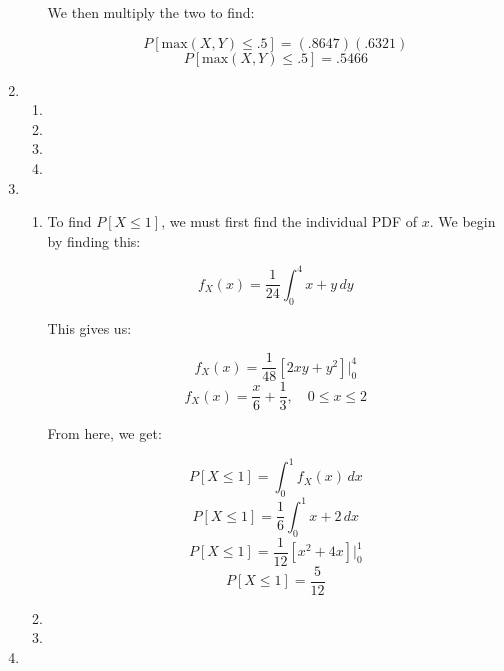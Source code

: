 \begin{enumerate}
\begin{enumerate}
        We then multiply the two to find:

        $$P[\text{max}(X,Y)\leq .5]=(.8647)(.6321)$$
        $$\boxed{P[\text{max}(X,Y)\leq .5]=.5466}$$

    \end{enumerate}

  \item

    \begin{enumerate}

      \item

      \item 

      \item 

      \item 

    \end{enumerate}

    \setcounter{enumi}{3}

  \item

    \begin{enumerate}

      \item To find $P[X\leq 1]$, we must first find the individual PDF of $x$. We begin by finding this:

        $$f_X(x)=\frac{1}{24}\int_0^4 x+y\,dy$$

        This gives us:

        $$f_X(x)=\frac{1}{48}\left[2xy+y^2\right]\Big|_0^4$$
        $$f_X(x)=\frac{x}{6}+\frac{1}{3},\quad 0\leq x\leq 2$$

        From here, we get:

        $$P[X\leq 1]=\int_0^1 f_X(x)\,dx$$
        $$P[X\leq 1]=\frac{1}{6}\int_0^1 x+2\,dx$$
        $$P[X\leq 1]=\frac{1}{12}\left[x^2+4x\right]\Big|_0^1$$
        $$\boxed{P[X\leq 1]=\frac{5}{12}}$$

      \item 

      \item 

    \end{enumerate}

    \setcounter{enumi}{5}

  \item

    \begin{enumerate}


\end{enumerate}
\end{enumerate}
